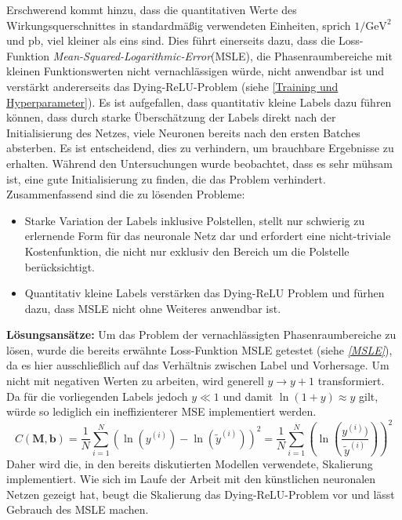 Erschwerend kommt hinzu, dass die quantitativen Werte des Wirkungsquerschnittes in standardmäßig verwendeten Einheiten, sprich $1/\text{GeV}^2$ und $\text{pb}$, viel kleiner als eins sind. Dies führt einerseits dazu, dass die Loss-Funktion \textit{Mean-Squared-Logarithmic-Error}(MSLE), die Phasenraumbereiche mit kleinen Funktionswerten nicht vernachlässigen würde, nicht anwendbar ist und verstärkt andererseits das Dying-ReLU-Problem (siehe \textsf{\autoref{Training und Hyperparameter}}). Es ist aufgefallen, dass quantitativ kleine Labels dazu führen können, dass durch starke Überschätzung der Labels direkt nach der Initialisierung des Netzes, viele Neuronen bereits nach den ersten Batches absterben. Es ist entscheidend, dies zu verhindern, um brauchbare Ergebnisse zu erhalten. Während den Untersuchungen wurde beobachtet, dass es sehr mühsam ist, eine gute Initialisierung zu finden, die das Problem verhindert. Zusammenfassend sind die zu lösenden Probleme:
\begin{itemize}
	\item Starke Variation der Labels inklusive Polstellen, stellt nur schwierig zu erlernende Form für das neuronale Netz dar und erfordert eine nicht-triviale Kostenfunktion, die nicht nur exklusiv den Bereich um die Polstelle berücksichtigt.
	\item Quantitativ kleine Labels verstärken das Dying-ReLU Problem und fürhen dazu, dass MSLE nicht ohne Weiteres anwendbar ist. 
\end{itemize}
\textbf{Lösungsansätze:}
Um das Problem der vernachlässigten Phasenraumbereiche zu lösen, wurde die bereits erwähnte Loss-Funktion MSLE getestet (siehe \textit{\autoref{MSLE}}), da es hier ausschließlich auf das Verhältnis zwischen Label und Vorhersage. Um nicht mit negativen Werten zu arbeiten, wird generell $y \rightarrow y + 1$ transformiert. Da für die vorliegenden Labels jedoch $y \ll 1$ und damit $\ln(1+y) \approx y$ gilt, würde so lediglich ein ineffizienterer MSE implementiert werden. 
\begin{equation}
C\left(\mathbf{M}, \mathbf{b}\right) = \frac{1}{N} \sum_{i=1}^{N} \left(\ln(y^{(i)}) - \ln(\tilde{y}^{(i)})\right)^2 = \frac{1}{N} \sum_{i=1}^{N} \left(\ln(\frac{y^{(i)})}{\tilde{y}^{(i)}})\right)^2
\label{MSLE}
\end{equation}
Daher wird die, in den bereits diskutierten Modellen verwendete, Skalierung implementiert. Wie sich im Laufe der Arbeit mit den künstlichen neuronalen Netzen gezeigt hat, beugt die Skalierung das Dying-ReLU-Problem vor und lässt Gebrauch des MSLE machen.

